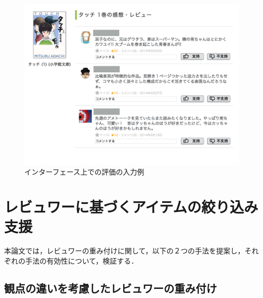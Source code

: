 \documentclass[a4paper,11pt,oneside,openany]{jsbook}
\begin{document}
\begin{figure}[htb]
	\begin{center} %
		\includegraphics[width = 130mm]{figures/feedback_image.pdf} %
	\end{center}
	\caption{インターフェース上での評価の入力例} %
	\label{fig:feedback_image} %
\end{figure}


\chapter{レビュワーに基づくアイテムの絞り込み支援}
本論文では，レビュワーの重み付けに関して，以下の２つの手法を提案し，それぞれの手法の有効性について，検証する．
	\section{観点の違いを考慮したレビュワーの重み付け}
	\label{sec:viewpoint_weight}
\end{document}
